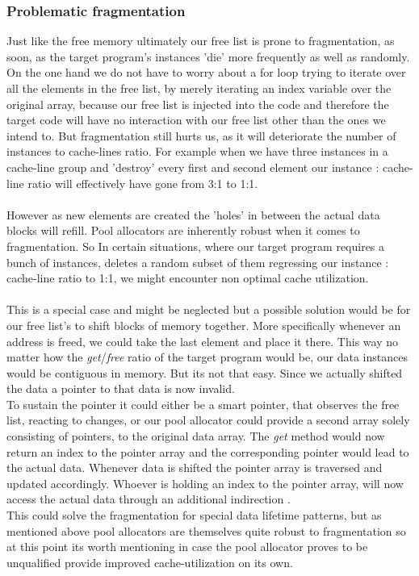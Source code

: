 \subsubsection{Problematic fragmentation}
Just like the free memory ultimately our free list is prone to fragmentation, as soon, as the target program's instances 'die' more frequently as well as randomly. On the one hand we do not have to worry about a for loop trying to iterate over all the elements in the free list, by merely iterating an index variable over the original array, because our free list is injected into the code and therefore the target code will have no interaction with our free list other than the ones we intend to. But fragmentation still hurts us, as it will deteriorate the number of instances to cache-lines ratio. For example when we have three instances in a cache-line group and 'destroy' every first and second element our instance : cache-line ratio will effectively have gone from 3:1 to 1:1.\\\\
However as new elements are created the 'holes' in between the actual data blocks will refill. Pool allocators are inherently robust when it comes to fragmentation. So In certain situations, where our target program requires a bunch of instances, deletes a random subset of them regressing our instance : cache-line ratio to 1:1, we might encounter non optimal cache utilization.\\\\
This is a special case and might be neglected but a possible solution would be for our free list's to shift blocks of memory together. More specifically whenever an address is freed, we could take the last element and place it there. This way no matter how the \textit{get}/\textit{free} ratio of the target program would be, our data instances would be contiguous in memory. But its not that easy. Since we actually shifted the data a pointer to that data is now invalid.\\
To sustain the pointer it could either be a smart pointer, that observes the free list, reacting to changes, or our pool allocator could provide a second array solely consisting of pointers, to the original data array. The \textit{get} method would now return an index to the pointer array and the corresponding pointer would lead to the actual data. Whenever data is shifted the pointer array is traversed and updated accordingly. Whoever is holding an index to the pointer array, will now access the actual data through an additional indirection .\\
This could solve the fragmentation for special data lifetime patterns, but as mentioned above pool allocators are themselves quite robust to fragmentation so at this point its worth mentioning in case the pool allocator proves to be unqualified provide improved cache-utilization on its own.\\\\

